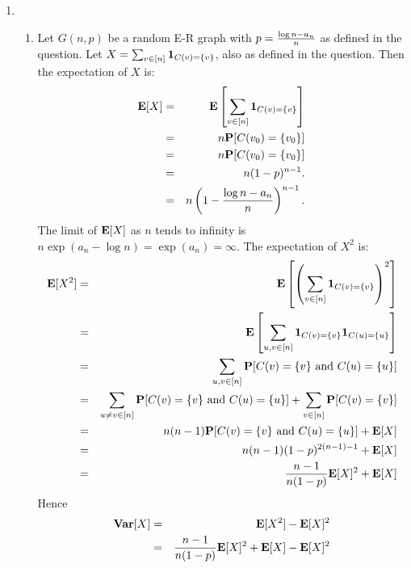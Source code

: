 \documentclass[11pt]{article} \usepackage{amssymb}
\newtheorem{claim}[theorem]{Claim}
\newenvironment{proof}{\noindent \textbf{Proof:}}{$\Box$}
\newcommand{\E}{{\bf E}} \newcommand{\Cov}{{\bf Cov}}
\newcommand{\Var}{{\bf Var}} \newcommand{\Varx}{\mathop{\bf Var\/}}
\begin{document}
\begin{enumerate}
\begin{enumerate}
    \item
      \begin{claim}
        If the branching process contains an 8-ary tree then $A_\infty$ has
        a left-to-right crossing.
      \end{claim}
      Note that by 1 (c) this means that $p_c<1$.
      \begin{proof}
        
      \end{proof}
    \end{enumerate}
  \item
    \begin{enumerate}
    \item 
      Let $G(n,p)$ be a random E-R graph with $p={\log n-a_n\over n}$ as defined
      in the question. Let $X=\sum_{v\in[n]}{\bf 1}_{C(v)=\{v\}}$, also as defined
      in the question. Then the expectation of $X$ is:
      \begin{eqnarray*}
        \E[X] &=& \E\left[\sum_{v\in[n]}{\bf 1}_{C(v)=\{v\}}\right]
        \\ &=& n\P[C(v_0)=\{v_0\}]
        \\ &=& n\P[C(v_0)=\{v_0\}]
        \\ &=& n(1-p)^{n-1}.
        \\ &=& n\left(1-{\log n-a_n\over n}\right)^{n-1}.
      \end{eqnarray*}
      The limit of $\E[X]$ as $n$ tends to infinity is 
      $n\exp(a_n-\log n)=\exp(a_n)=\infty$.
      The expectation of $X^2$ is:
      \begin{eqnarray*}
        \E[X^2] &=& \E\left[\left(\sum_{v\in[n]}{\bf 1}_{C(v)=\{v\}}\right)^2\right]
        \\ &=& \E\left[\sum_{u,v\in[n]}{\bf 1}_{C(v)=\{v\}}{\bf 1}_{C(u)=\{u\}}\right]
        \\ &=& \sum_{u,v\in[n]}\P[C(v)=\{v\} \mbox{ and } C(u)=\{u\}]
        \\ &=& \sum_{u\neq v\in[n]}\P[C(v)=\{v\} \mbox{ and } C(u)=\{u\}]+\sum_{v\in[n]}\P[C(v)=\{v\}]
        \\ &=& n(n-1)\P[C(v)=\{v\} \mbox{ and } C(u)=\{u\}]+\E[X]
        \\ &=& n(n-1)(1-p)^{2(n-1)-1}+\E[X]
        \\ &=& {n-1\over n(1-p)}\E[X]^2+\E[X]
      \end{eqnarray*}
      Hence
      \begin{eqnarray*}
        \Var[X]&=&\E[X^2]-\E[X]^2
        \\ &=& {n-1\over n(1-p)}\E[X]^2+\E[X] - \E[X]^2

\end{eqnarray*}
\end{enumerate}
\end{enumerate}
\end{document}

